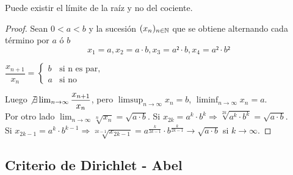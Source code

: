 \begin{eg}
  Puede existir el límite de la raíz y no del cociente.
  \begin{proof}
    Sean $0 < a < b$ y la sucesión $(x_n)_{n \in \mathbb{N}}$ que se obtiene alternando cada término por $a$ ó $b$ \begin{equation}
      x_1 = a, x_2 = a \cdot b, x_3 = a² \cdot b, x_4 = a² \cdot b²
    \end{equation}

    $\dfrac{x_{n+1}}{x_n} = \begin{cases}
        b & \text{si n es par}, \\
        a & \text{si no}
      \end{cases}$

    Luego $\not \exists \lim_{n \to \infty} \dfrac{x_{n+1}}{x_n}$, pero $\limsup_{n \to \infty} x_n = b$, $\liminf_{n \to \infty} x_n = a$. \\
    Por otro lado $\lim_{n \to \infty} \sqrt[n]{x_n} = \sqrt{a \cdot b}$. Si $x_{2k} = a^k \cdot b^k \Rightarrow \sqrt[2k]{a^k \cdot b^k} = \sqrt{a \cdot b}$. \\
    Si $x_{2k-1} = a^k \cdot b^{k-1} \Rightarrow \sqrt[2k-1]{x_{2k-1}} = a^{\frac{k}{2k-1}} \cdot b^{\frac{k}{2k-1}} \to \sqrt{a \cdot b}$ si $k \to \infty$.
  \end{proof}
\end{eg}

\subsection{Criterio de Dirichlet - Abel}

